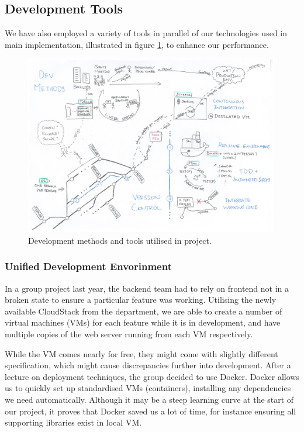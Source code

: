 \documentclass[a4paper, titlepage]{article}
\begin{document}
\subsection{Development Tools}
We have also employed a variety of tools in parallel of our technologies used
in main implementation, illustrated in figure \ref{fig:projman_devtools}, to
enhance our performance.

\begin{figure}[ht]
  \centering
    \includegraphics[width = 0.99\textwidth]{./projman/devtools.pdf}
  \caption{Development methods and tools utilised in project.}
  \label{fig:projman_devtools}
\end{figure}

\subsubsection{Unified Development Envorinment} \label{sec:projman_devenv}


In a group project last year, the backend team had to rely on frontend not in a broken state to ensure a 
particular feature was working. Utilising the newly available CloudStack from the department,
we are able to create a number of virtual machines (VMs) for each feature while it is in development,
and have multiple copies of the web server running from each VM respectively.

While the VM comes nearly for free, they might come with slightly different specification,
which might cause discrepancies further into development. After a lecture on deployment techniques, the group decided to use Docker. Docker allows us to quickly set up standardised VMs (containers), installing any dependencies we need automatically. Although it may be a steep learning curve at the start of our project, it proves that Docker saved us a lot of time, 
for instance ensuring all supporting libraries exist in local VM.
\end{document}
